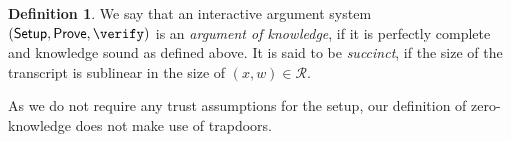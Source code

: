 \documentclass[10pt,article,oneside]{memoir}
\theoremstyle{definition}
\newtheorem{defn}[thm]{Definition}
\theoremstyle{remark}
\DeclareMathOperator{\setup}{\mathsf{Setup}}
\DeclareMathOperator{\prove}{\mathsf{Prove}}
\begin{document}

\begin{defn}
\label{def:ArgumentOfKnowledge}
We say that an interactive argument system $(\setup, \prove,\verify)$ is an \textit{argument of knowledge}, if it is perfectly complete and knowledge sound as defined above.
It is said to be \textit{succinct}, if the size of the transcript is sublinear in the size of $(x,w)\in\mathcal R$.
\end{defn}

\medskip
As we do not require any trust assumptions for the setup, our definition of zero-knowledge does not make use of trapdoors. 
\end{document}
